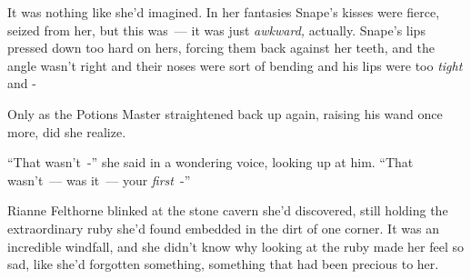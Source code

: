 It was nothing like she'd imagined. In her fantasies Snape's kisses were fierce, seized from her, but this was~--- it was just \emph{awkward,} actually. Snape's lips pressed down too hard on hers, forcing them back against her teeth, and the angle wasn't right and their noses were sort of bending and his lips were too \emph{tight} and -

Only as the Potions Master straightened back up again, raising his wand once more, did she realize.

``That wasn't~-'' she said in a wondering voice, looking up at him. ``That wasn't~--- was it~--- your \emph{first}~-''

Rianne Felthorne blinked at the stone cavern she'd discovered, still holding the extraordinary ruby she'd found embedded in the dirt of one corner. It was an incredible windfall, and she didn't know why looking at the ruby made her feel so sad, like she'd forgotten something, something that had been precious to her.
